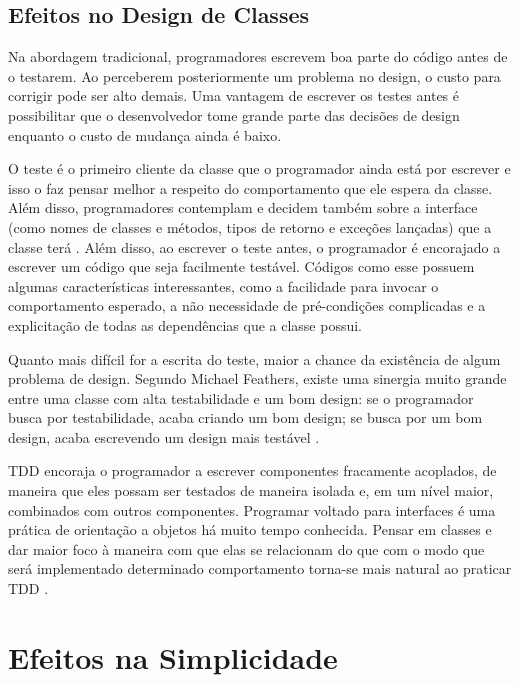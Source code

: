 \subsection{Efeitos no Design de Classes}

Na abordagem tradicional, programadores escrevem boa parte do código antes de
o testarem. Ao perceberem posteriormente um problema no design, o custo para
corrigir pode ser alto demais. Uma vantagem de escrever os testes antes é
possibilitar que o desenvolvedor tome grande parte das decisões de design
enquanto o custo de mudança ainda é baixo.

O teste é o primeiro cliente da
classe que o programador ainda está por escrever e isso o faz pensar
melhor a respeito do comportamento que ele espera da classe. Além disso,
programadores contemplam e decidem também sobre a interface (como nomes de
classes e métodos, tipos de retorno e exceções lançadas) que a classe terá
\cite{janzen-saiedian}.
Além disso, ao escrever o teste antes, o programador é encorajado a escrever um
código que seja facilmente testável. Códigos como esse possuem algumas
características interessantes, como a facilidade para invocar o comportamento
esperado, a não necessidade de pré-condições complicadas e a explicitação de
todas as dependências que a classe possui.

Quanto mais difícil for a escrita do teste, maior a chance da existência de
algum problema de design. Segundo Michael Feathers, existe uma sinergia muito
grande entre uma classe com alta testabilidade e um bom design: se o
programador busca por testabilidade, acaba criando um bom design; se 
busca por um bom design, acaba escrevendo um design mais
testável \cite{feathers-synergy}.

TDD encoraja o programador a escrever componentes fracamente acoplados, de
maneira que eles possam ser testados de maneira isolada e, em um nível maior,
combinados com outros componentes.
Programar voltado para interfaces é uma prática de orientação a objetos há muito
tempo conhecida. Pensar em classes e dar maior foco à maneira com que
elas se relacionam do que com o modo que será implementado determinado
comportamento torna-se mais natural ao praticar TDD \cite{GOOS}. 

\section{Efeitos na Simplicidade}

